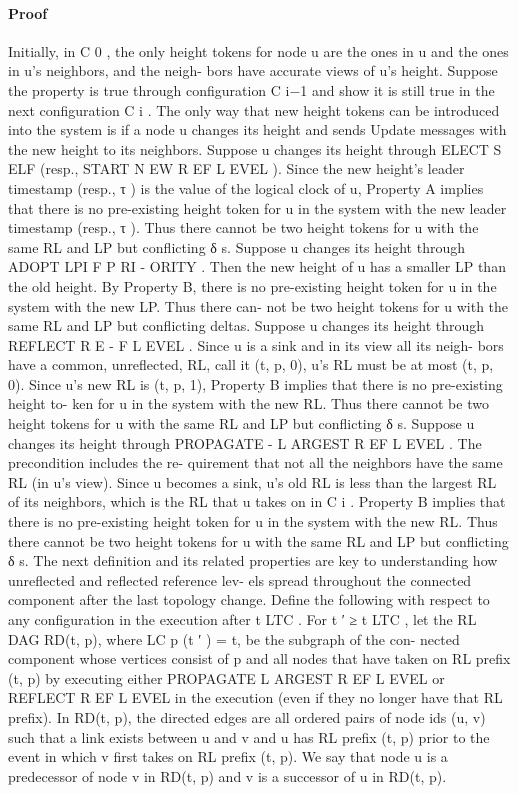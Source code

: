 \documentclass{article}
\begin{document}
\paragraph{Proof}
Initially, in C 0 , the only height tokens for node u are
the ones in u and the ones in u’s neighbors, and the neigh-
bors have accurate views of u’s height.
Suppose the property is true through configuration C i−1
and show it is still true in the next configuration C i . The
only way that new height tokens can be introduced into the
system is if a node u changes its height and sends Update
messages with the new height to its neighbors.
Suppose u changes its height through ELECT S ELF (resp.,
START N EW R EF L EVEL ). Since the new height’s leader
timestamp (resp., τ ) is the value of the logical clock of u,
Property A implies that there is no pre-existing height token
for u in the system with the new leader timestamp (resp., τ ).
Thus there cannot be two height tokens for u with the same
RL and LP but conflicting δ s.
Suppose u changes its height through ADOPT LPI F P RI -
ORITY . Then the new height of u has a smaller LP than the
old height. By Property B, there is no pre-existing height
token for u in the system with the new LP. Thus there can-
not be two height tokens for u with the same RL and LP but
conflicting deltas.
Suppose u changes its height through REFLECT R E -
F L EVEL . Since u is a sink and in its view all its neigh-
bors have a common, unreflected, RL, call it (t, p, 0), u’s
RL must be at most (t, p, 0). Since u’s new RL is (t, p, 1),
Property B implies that there is no pre-existing height to-
ken for u in the system with the new RL. Thus there cannot
be two height tokens for u with the same RL and LP but
conflicting δ s.
Suppose u changes its height through PROPAGATE -
L ARGEST R EF L EVEL . The precondition includes the re-
quirement that not all the neighbors have the same RL (in
u’s view). Since u becomes a sink, u’s old RL is less than
the largest RL of its neighbors, which is the RL that u takes
on in C i . Property B implies that there is no pre-existing
height token for u in the system with the new RL.
Thus there cannot be two height tokens for u with the
same RL and LP but conflicting δ s.
The next definition and its related properties are key to
understanding how unreflected and reflected reference lev-
els spread throughout the connected component after the
last topology change.
Define the following with respect to any configuration
in the execution after t LTC . For t ′ ≥ t LTC , let the RL DAG
RD(t, p), where LC p (t ′ ) = t, be the subgraph of the con-
nected component whose vertices consist of p and all nodes
that have taken on RL prefix (t, p) by executing either
PROPAGATE L ARGEST R EF L EVEL or REFLECT R EF L EVEL
in the execution (even if they no longer have that RL
prefix). In RD(t, p), the directed edges are all ordered pairs
of node ids (u, v) such that a link exists between u and v and
u has RL prefix (t, p) prior to the event in which v first takes
on RL prefix (t, p). We say that node u is a predecessor of
node v in RD(t, p) and v is a successor of u in RD(t, p).
\end{document}
